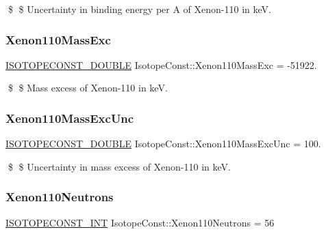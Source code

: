 \$ \$ Uncertainty in binding energy per A of Xenon-\/110 in keV. \mbox{\label{group___isotope_const-_xenon-_xe110_gaa3b1024e2031e6767879d8f1f9e0a0cc}} 
\subsubsection{\texorpdfstring{Xenon110\+Mass\+Exc}{Xenon110MassExc}}
{\footnotesize\ttfamily \mbox{\hyperlink{group___isotope_const-_macros_ga8f45a7272ce02c0b4c65c44636ed719a}{I\+S\+O\+T\+O\+P\+E\+C\+O\+N\+S\+T\+\_\+\+D\+O\+U\+B\+LE}} Isotope\+Const\+::\+Xenon110\+Mass\+Exc = -\/51922.}

\$ \$ Mass excess of Xenon-\/110 in keV. \mbox{\label{group___isotope_const-_xenon-_xe110_ga23d511be8c9ae7660863f9a9e7dc1c86}} 
\subsubsection{\texorpdfstring{Xenon110\+Mass\+Exc\+Unc}{Xenon110MassExcUnc}}
{\footnotesize\ttfamily \mbox{\hyperlink{group___isotope_const-_macros_ga8f45a7272ce02c0b4c65c44636ed719a}{I\+S\+O\+T\+O\+P\+E\+C\+O\+N\+S\+T\+\_\+\+D\+O\+U\+B\+LE}} Isotope\+Const\+::\+Xenon110\+Mass\+Exc\+Unc = 100.}

\$ \$ Uncertainty in mass excess of Xenon-\/110 in keV. \mbox{\label{group___isotope_const-_xenon-_xe110_ga39aab178bcfa38ea31c9e134731545ad}} 
\subsubsection{\texorpdfstring{Xenon110\+Neutrons}{Xenon110Neutrons}}
{\footnotesize\ttfamily \mbox{\hyperlink{group___isotope_const-_macros_ga5f18360b3e99483a35c32d789e62621c}{I\+S\+O\+T\+O\+P\+E\+C\+O\+N\+S\+T\+\_\+\+I\+NT}} Isotope\+Const\+::\+Xenon110\+Neutrons = 56}

